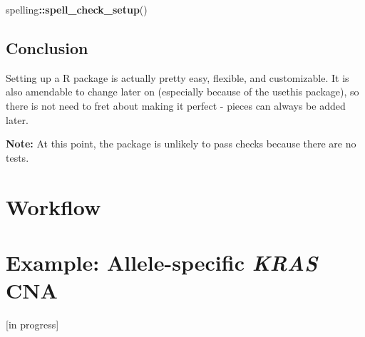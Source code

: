 \documentclass[]{book}
\newenvironment{Shaded}{\begin{snugshade}}{\end{snugshade}}
\newcommand{\KeywordTok}[1]{\textcolor[rgb]{0.13,0.29,0.53}{\textbf{#1}}}
\newcommand{\OperatorTok}[1]{\textcolor[rgb]{0.81,0.36,0.00}{\textbf{#1}}}
\newcommand{\NormalTok}[1]{#1}
\begin{document}
\begin{Shaded}
\begin{Highlighting}[]
\NormalTok{spelling}\OperatorTok{::}\KeywordTok{spell_check_setup}\NormalTok{()}
\end{Highlighting}
\end{Shaded}

\section{Conclusion}\label{conclusion}

Setting up a R package is actually pretty easy, flexible, and
customizable. It is also amendable to change later on (especially
because of the usethis package), so there is not need to fret about
making it perfect - pieces can always be added later.

\textbf{Note:} At this point, the package is unlikely to pass checks
because there are no tests.

\chapter{Workflow}\label{workflow}

\chapter{\texorpdfstring{Example: Allele-specific \emph{KRAS}
CNA}{Example: Allele-specific KRAS CNA}}\label{example-allele-specific-kras-cna}

{[}in progress{]}


\end{document}
